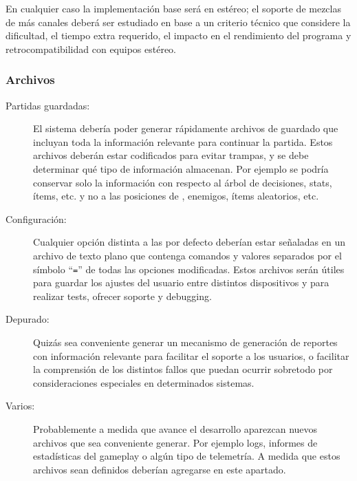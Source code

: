 En cualquier caso la implementación base será en estéreo; el soporte de mezclas de más canales deberá ser estudiado en base a un criterio técnico que considere la dificultad, el tiempo extra requerido, el impacto en el rendimiento del programa y retrocompatibilidad con equipos estéreo.

\subsubsection{Archivos}
\begin{description}
\item[Partidas guardadas:] El sistema debería poder generar rápidamente archivos de guardado que incluyan toda la información relevante para continuar la partida. Estos archivos deberán estar codificados para evitar trampas, y se debe determinar qué tipo de información almacenan. Por ejemplo se podría conservar solo la información con respecto al árbol de decisiones, stats, ítems, etc. y no a las posiciones de , enemigos, ítems aleatorios, etc.

\item[Configuración:] Cualquier opción distinta a las por defecto deberían estar señaladas en un archivo de texto plano que contenga comandos y valores separados por el símbolo “\texttt{=}” de todas las opciones modificadas.
Estos archivos serán útiles para guardar los ajustes del usuario entre distintos dispositivos y para realizar tests, ofrecer soporte y debugging.

\item[Depurado:] Quizás sea conveniente generar un mecanismo de generación de reportes con información relevante para facilitar el soporte a los usuarios, o facilitar la comprensión de los distintos fallos que puedan ocurrir sobretodo por consideraciones especiales en determinados sistemas.

\item[Varios:] Probablemente a medida que avance el desarrollo aparezcan nuevos archivos que sea conveniente generar. Por ejemplo logs, informes de estadísticas del gameplay o algún tipo de telemetría. A medida que estos archivos sean definidos deberían agregarse en este apartado.
\end{description}

